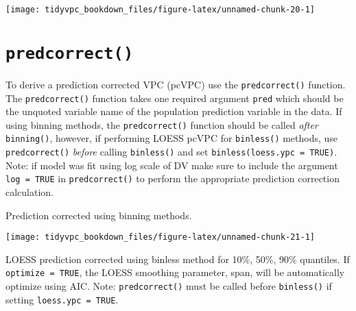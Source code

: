 \documentclass[
]{book}
\newenvironment{Shaded}{\begin{snugshade}}{\end{snugshade}}
\newcommand{\DataTypeTok}[1]{\textcolor[rgb]{0.13,0.29,0.53}{#1}}
\newcommand{\KeywordTok}[1]{\textcolor[rgb]{0.13,0.29,0.53}{\textbf{#1}}}
\newcommand{\NormalTok}[1]{#1}
\newcommand{\OperatorTok}[1]{\textcolor[rgb]{0.81,0.36,0.00}{\textbf{#1}}}
\newcommand{\StringTok}[1]{\textcolor[rgb]{0.31,0.60,0.02}{#1}}
\begin{document}
\texttt{[image: tidyvpc\_bookdown\_files/figure-latex/unnamed-chunk-20-1]}

\hypertarget{predcorrect}{%
\section{\texorpdfstring{\texttt{predcorrect()}}{predcorrect()}}\label{predcorrect}}

To derive a prediction corrected VPC (pcVPC) use the \texttt{predcorrect()} function. The \texttt{predcorrect()} function takes one required argument \texttt{pred} which should be the unquoted variable name of the population prediction variable in the data. If using binning methods, the \texttt{predcorrect()} function should be called \emph{after} \texttt{binning()}, however, if performing LOESS pcVPC for \texttt{binless()} methods, use \texttt{predcorrect()} \emph{before} calling \texttt{binless()} and set \texttt{binless(loess.ypc\ =\ TRUE)}. Note: if model was fit using log scale of DV make sure to include the argument \texttt{log\ =\ TRUE} in \texttt{predcorrect()} to perform the appropriate prediction correction calculation.

Prediction corrected using binning methods.

\begin{Shaded}
\end{Shaded}

\texttt{[image: tidyvpc\_bookdown\_files/figure-latex/unnamed-chunk-21-1]}

LOESS prediction corrected using binless method for 10\%, 50\%, 90\% quantiles. If \texttt{optimize\ =\ TRUE}, the LOESS smoothing parameter, span, will be automatically optimize using AIC. Note: \texttt{predcorrect()} must be called before \texttt{binless()} if setting \texttt{loess.ypc\ =\ TRUE}.
\end{document}
